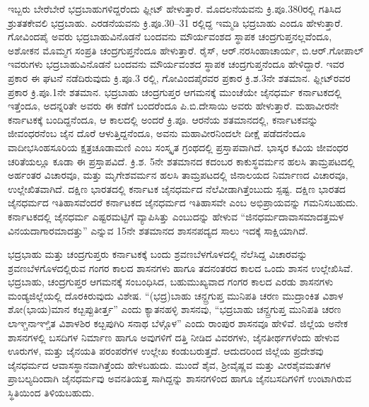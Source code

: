 ಇಬ್ಬರು ಬೇರೆಬೇರೆ ಭದ್ರಬಾಹುಗಳಿದ್ದರೆಂದು ಫ್ಲೀಟ್​ ಹೇಳುತ್ತಾರೆ. ಮೊದಲನೆಯವನು ಕ್ರಿ.ಪೂ.380ರಲ್ಲಿ ಗತಿಸಿದ ಶ್ರುತತಕೇವಲಿ ಭದ್ರಬಾಹು. ಎರಡನೆಯವನು ಕ್ರಿ.ಪೂ.30–31 ರಲ್ಲಿದ್ದ ಇಮ್ಮಡಿ ಭದ್ರಬಾಹು ಎಂದೂ ಹೇಳುತ್ತಾರೆ. ಗೋವಿಂದಪೈ ಅವರು ಭದ್ರಬಾಹುವಿನೊಡನೆ ಬಂದವನು ಮೌರ್ಯವಂಶದ ಸ್ಥಾಪಕ ಚಂದ್ರಗುಪ್ತನಲ್ಲವೆಂದೂ, ಅಶೋಕನ ಮೊಮ್ಮಗ ಸಂಪ್ರತಿ ಚಂದ್ರಗುಪ್ತನೆಂದೂ ಹೇಳುತ್ತಾರೆ. ರೈಸ್​, ಆರ್​.ನರಸಿಂಹಾಚಾರ್ಯ, ಬಿ.ಆರ್​.ಗೋಪಾಲ್​ ಇವರುಗಳು ಭದ್ರಬಾಹುವಿನೊಡನೆ ಬಂದವನು ಮೌರ್ಯವಂಶದ ಸ್ಥಾಪಕ ಚಂದ್ರಗುಪ್ತನೆಂದೂ ಹೇಳಿದ್ದಾರೆ. ಇವರ ಪ್ರಕಾರ ಈ ಘಟನೆ ನಡೆದಿರುವುದು ಕ್ರಿ.ಪೂ.3 ರಲ್ಲಿ, ಗೋವಿಂದಪೈರವರ ಪ್ರಕಾರ ಕ್ರಿ.ಶ.3ನೇ ಶತಮಾನ. ಫ್ಲೀಟ್​ರವರ ಪ್ರಕಾರ ಕ್ರಿ.ಪೂ.1ನೇ ಶತಮಾನ. ಭದ್ರಬಾಹು ಚಂದ್ರಗುಪ್ತರ ಆಗಮನಕ್ಕೆ ಮುಂಚೆಯೇ ಜೈನಧರ್ಮ ಕರ್ನಾಟಕದಲ್ಲಿ ಇತ್ತೆಂದೂ, ಅದನ್ನರಿತೇ ಅವರು ಈ ಕಡೆಗೆ ಬಂದರೆಂದೂ ಪಿ.ಬಿ.ದೇಸಾಯಿ ಅವರು ಹೇಳುತ್ತಾರೆ. ಮಹಾವೀರನೇ ಕರ್ನಾಟಕಕ್ಕೆ ಬಂದಿದ್ದನೆಂದೂ, ಆ ಕಾಲದಲ್ಲಿ ಅಂದರೆ ಕ್ರಿ.ಪೂ. ಆರನೆಯ ಶತಮಾನದಲ್ಲಿ, ಕರ್ನಾಟಕವನ್ನು ಜೀವಂಧರನೆಂಬ ಜೈನ ದೊರೆ ಆಳುತ್ತಿದ್ದನೆಂದೂ, ಅವನು ಮಹಾವೀರನಿಂದಲೇ ದೀಕ್ಷೆ ಪಡೆದನೆಂದೂ ವಾದೀಭಸಿಂಹಸೂರಿಯ ಕ್ಷತ್ರಚೂಡಾಮಣಿ ಎಂಬ ಸಂಸ್ಕೃತ ಗ್ರಂಥದಲ್ಲಿ ಪ್ರಸ್ತಾಪವಾಗಿದೆ. ಭಾಸ್ಕರ ಕವಿಯ ಜೀವಂಧರ ಚರಿತೆಯಲ್ಲೂ ಕೂಡಾ ಈ ಪ್ರಸ್ತಾಪವಿದೆ. ಕ್ರಿ.ಶ. 5ನೇ ಶತಮಾನದ ಕದಂಬರ ಕಾಕುಸ್ಥವರ್ಮನ ಹಲಸಿ ತಾಮ್ರಪಟದಲ್ಲಿ ಅರ್ಹಂತರ ವಿಚಾರವೂ,  ಮತ್ತು ಮೃಗೇಶವರ್ಮನ ಹಲಸಿ ತಾಮ್ರಪಟದಲ್ಲಿ ಜಿನಾಲಯದ ನಿರ್ಮಾಣದ ವಿಚಾರವೂ,  ಉಲ್ಲೇಖಿತವಾಗಿದೆ. ದಕ್ಷಿಣ ಭಾರತದಲ್ಲಿ ಕರ್ನಾಟಕ ಜೈನಧರ್ಮದ ನೆಲೆವೀಡಾಗಿತ್ತೆಂಬುದು ಸ್ಪಷ್ಟ. ದಕ್ಷಿಣ ಭಾರತದ ಜೈನಧರ್ಮದ ಇತಿಹಾಸವೆಂದರೆ ಕರ್ನಾಟಕದ ಜೈನಧರ್ಮದ ಇತಿಹಾಸವೇ ಎಂಬ ಅಭಿಪ್ರಾಯವನ್ನು ಗಮನಿಸಬಹುದು. ಕರ್ನಾಟಕದಲ್ಲಿ ಜೈನಧರ್ಮ ಎಷ್ಟರಮಟ್ಟಿಗೆ ವ್ಯಾಪಿಸಿತ್ತು ಎಂಬುದನ್ನು ಹೇಳುವ “ಜಿನಧರ್ಮದಾವಾಸಮಾದತ್ತಮಳ ವಿನಯದಾಗಾರಮಾದತ್ತು” ಎನ್ನುವ 15ನೇ ಶತಮಾನದ ಶಾಸನಪದ್ಯದ ಸಾಲು ಇದಕ್ಕೆ ಸಾಕ್ಷಿಯಾಗಿದೆ.

ಭದ್ರಭಾಹು ಮತ್ತು ಚಂದ್ರಗುಪ್ತರು ಕರ್ನಾಟಕಕ್ಕೆ ಬಂದು ಶ್ರವಣಬೆಳಗೊಳದಲ್ಲಿ ನೆಲೆಸಿದ್ದ ವಿಚಾರವನ್ನು ಶ್ರವಣಬೆಳಗೊಳದಲ್ಲಿರುವ ಗಂಗರ ಕಾಲದ ಶಾಸನಗಳು ಹಾಗೂ ತದನಂತರದ ಕಾಲದ ಒಂದು ಶಾಸನ ಉಲ್ಲೇಖಿಸಿವೆ. ಭದ್ರಬಾಹು, ಚಂದ್ರಗುಪ್ತರ ಆಗಮನಕ್ಕೆ ಸಂಬಂಧಿಸಿದ, ಬಹುಮುಖ್ಯವಾದ ಗಂಗರ ಕಾಲದ ಎರಡು ಶಾಸನಗಳು ಮಂಡ್ಯಜಿಲ್ಲೆಯಲ್ಲಿ ದೊರಕಿರುವುದು ವಿಶೇಷ. “(ಭದ್ರ)ಬಾಹು ಚನ್ದ್ರಗುಪ್ತ ಮುನಿಪತಿ ಚರಣ ಮುದ್ರಾಂಕಿತ ವಿಶಾಳ ಶೋ(ಭಾಯ)ಮಾನ ಕೞ್ಬಪ್ಪುತೀರ್ತ್ತ” ಎಂದು ಕ್ಯಾತನಹಳ್ಳಿ ಶಾಸನವು, “ಭದ್ರಬಾಹು ಚನ್ದ್ರಗುಪ್ತ ಮುನಿಪತಿ ಚರಣ ಲಾಞ್ಚನಾಞ್ಚಿತ ವಿಶಾಳಶಿರ ಕೞ್ಬಪುಗಿರಿ ಸನಾಥ ಬೆಳ್ಗೊಳ” ಎಂದು ರಾಂಪುರ ಶಾಸನವೂ ಹೇಳಿವೆ. ಜಿಲ್ಲೆಯ ಅನೇಕ ಶಾಸನಗಳಲ್ಲಿ ಬಸದಿಗಳ ನಿರ್ಮಾಣ ಹಾಗೂ ಅವುಗಳಿಗೆ ದತ್ತಿ ನೀಡಿದ ವಿವರಗಳು, ಜೈನತೀರ್ಥಗಳೆಂದು ಹೇಳುವ ಊರುಗಳ, ಮತ್ತು ಜೈನಯತಿ ಪರಂಪರೆಗಳ ಉಲ್ಲೇಖ ಕಂಡುಬರುತ್ತದೆ. ಆದುದರಿಂದ ಜಿಲ್ಲೆಯ ಪ್ರದೇಶವು ಜೈನಧರ್ಮದ ಆವಾಸಸ್ಥಾನವಾಗಿತ್ತೆಂದು ಹೇಳಬಹುದು. ಮುಂದೆ ಶೈವ, ಶ‍್ರೀವೈಷ್ಣವ ಮತ್ತು ವೀರಶೈವಮತಗಳ ಪ್ರಾಬಲ್ಯದಿಂದಾಗಿ ಜೈನಧರ್ಮವು ಅವನತಿಯತ್ತ ಸಾಗಿದ್ದನ್ನು ಶಾಸನಗಳಿಂದ ಹಾಗೂ ಜೈನಬಸದಿಗಳಿಗೆ ಉಂಟಾಗಿರುವ ಸ್ಥಿತಿಯಿಂದ ತಿಳಿಯಬಹುದು.

